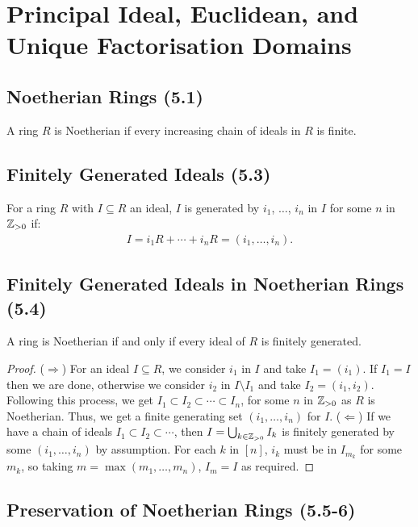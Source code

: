 \section{Principal Ideal, Euclidean, and Unique Factorisation Domains}

\subsection{Noetherian Rings (5.1)} \label{5.1}

A ring $R$ is Noetherian if every increasing chain of ideals in $R$
is finite.

\subsection{Finitely Generated Ideals (5.3)} \label{5.3}

For a ring $R$ with $I \subseteq R$ an ideal, $I$ is generated by
$i_1$, $\ldots$, $i_n$ in $I$ for some $n$ in $\mathbb{Z}_{>0}$ if:
\begin{align*}
    I = i_1R + \cdots + i_nR = (i_1, \ldots, i_n).
\end{align*}

\subsection{Finitely Generated Ideals in Noetherian Rings (5.4)} \label{5.4}

A ring is Noetherian if and only if every ideal of $R$ is finitely
generated.

\begin{proof}
    ($\Longrightarrow$) For an ideal $I \subseteq R$, we consider
    $i_1$ in $I$ and take $I_1 = (i_1)$. If $I_1 = I$ then we are
    done, otherwise we consider $i_2$ in $I \setminus I_1$ and
    take $I_2 = (i_1, i_2)$. Following this process, we get
    $I_1 \subset I_2 \subset \cdots \subset I_n$, for some $n$ in
    $\mathbb{Z}_{>0}$ as $R$ is Noetherian. Thus, we get a finite 
    generating set $(i_1, \ldots, i_n)$ for $I$.
    \bs
    ($\Longleftarrow$) If we have a chain of ideals
    $I_1 \subset I_2 \subset \cdots$, then 
    $I = \bigcup_{k \in \mathbb{Z}_{>0}} I_k$ is finitely generated
    by some $(i_1, \ldots, i_n)$ by assumption. For each $k$ in
    $[n]$, $i_k$ must be in $I_{m_k}$ for some $m_k$, so
    taking $m = \max(m_1, \ldots, m_n)$, $I_m = I$ as required.
\end{proof}

\subsection{Preservation of Noetherian Rings (5.5-6)} \label{5.5} \label{5.6}

